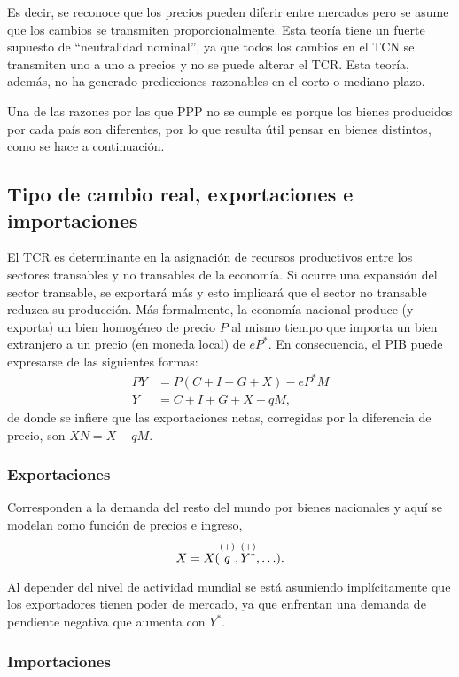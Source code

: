 \documentclass[DeGregorioResumen]{subfiles}
\begin{document}
Es decir, se reconoce que los precios pueden diferir entre mercados pero se asume que los cambios se transmiten proporcionalmente. Esta teoría tiene un fuerte supuesto de ``neutralidad nominal'', ya que todos los cambios en el TCN se transmiten uno a uno a precios y no se puede alterar el TCR. Esta teoría, además, no ha generado predicciones razonables en el corto o mediano plazo.

Una de las razones por las que PPP no se cumple es porque los bienes producidos por cada país son diferentes, por lo que resulta útil pensar en bienes distintos, como se hace a continuación.

\subsection{Tipo de cambio real, exportaciones e importaciones}

El TCR es determinante en la asignación de recursos productivos entre los sectores transables y no transables de la economía. Si ocurre una expansión del sector transable, se exportará más y esto implicará que el sector no transable reduzca su producción. Más formalmente, la economía nacional produce (y exporta) un bien homogéneo de precio $P$ al mismo tiempo que importa un bien extranjero a un precio (en moneda local) de $eP^*$. En consecuencia, el PIB puede expresarse de las siguientes formas:
\begin{align}
	PY &= P(C+I+G+X)-eP^*M \\
	Y &= C+I+G+X-qM,
\end{align}
de donde se infiere que las exportaciones netas, corregidas por la diferencia de precio, son $XN=X-qM$.

\subsubsection{Exportaciones}

Corresponden a la demanda del resto del mundo por bienes nacionales y aquí se modelan como función de precios e ingreso,
\[
X = X(\overset{(+)}{\mathstrut q}, \overset{(+)}{\mathstrut Y^*}, \ldots).
\]

Al depender del nivel de actividad mundial se está asumiendo implícitamente que los exportadores tienen poder de mercado, ya que enfrentan una demanda de pendiente negativa que aumenta con $Y^*$.

\subsubsection{Importaciones}
\end{document}
